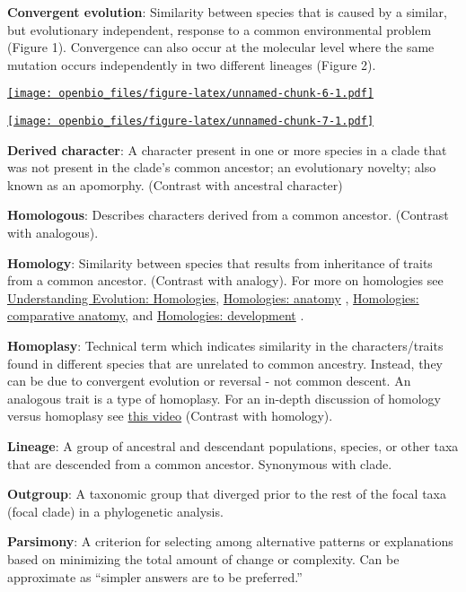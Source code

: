 \documentclass[
]{book}
\begin{document}
\textbf{Convergent evolution}: Similarity between species that is caused by a similar, but evolutionary independent, response to a common environmental problem (Figure 1). Convergence can also occur at the molecular level where the same mutation occurs independently in two different lineages (Figure 2).

\href{https://wp.biologos.org/wp-content/uploads/2018/10/venema_23_1.jpg}{\texttt{[image: openbio\_files/figure-latex/unnamed-chunk-6-1.pdf]}}

\href{https://wp.biologos.org/wp-content/uploads/2018/10/venema_22_7.jpg}{\texttt{[image: openbio\_files/figure-latex/unnamed-chunk-7-1.pdf]}}

\textbf{Derived character}: A character present in one or more species in a clade that was not present in the clade's common ancestor; an evolutionary novelty; also known as an apomorphy. (Contrast with ancestral character)

\textbf{Homologous}: Describes characters derived from a common ancestor. (Contrast with analogous).

\textbf{Homology}: Similarity between species that results from inheritance of traits from a common ancestor. (Contrast with analogy). For more on homologies see \href{https://evolution.berkeley.edu/evolibrary/article/0_0_0/lines_04}{Understanding Evolution: Homologies}, \href{https://evolution.berkeley.edu/evolibrary/article/0_0_0/lines_05}{Homologies: anatomy} , \href{https://evolution.berkeley.edu/evolibrary/article/0_0_0/lines_06}{Homologies: comparative anatomy}, and \href{https://evolution.berkeley.edu/evolibrary/article/0_0_0/lines_07}{Homologies: development} .

\textbf{Homoplasy}: Technical term which indicates similarity in the characters/traits found in different species that are unrelated to common ancestry. Instead, they can be due to convergent evolution or reversal - not common descent. An analogous trait is a type of homoplasy. For an in-depth discussion of homology versus homoplasy see \href{https://www.youtube.com/watch?v=W-APHQ94gog}{this video} (Contrast with homology).

\textbf{Lineage}: A group of ancestral and descendant populations, species, or other taxa that are descended from a common ancestor. Synonymous with clade.

\textbf{Outgroup}: A taxonomic group that diverged prior to the rest of the focal taxa (focal clade) in a phylogenetic analysis.

\textbf{Parsimony}: A criterion for selecting among alternative patterns or explanations based on minimizing the total amount of change or complexity. Can be approximate as ``simpler answers are to be preferred.''
\end{document}
